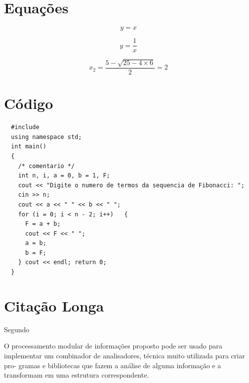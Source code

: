   \section{Equações}

  \begin{equation}
  y = x
  \end{equation}

  \begin{equation}
  y = \frac{1}{x}
  \end{equation}

  \begin{equation}
  x_2 = \frac{5 - \sqrt{25 - 4 \times 6}}{2} = 2
  \end{equation}

  \newpage
  \section{Código}

  \begin{lstlisting}
  #include 
  using namespace std;
  int main()
  {
    /* comentario */
    int n, i, a = 0, b = 1, F;
    cout << "Digite o numero de termos da sequencia de Fibonacci: ";
    cin >> n;
    cout << a << " " << b << " ";
    for (i = 0; i < n - 2; i++)   {
      F = a + b;
      cout << F << " ";
      a = b;
      b = F;
    } cout << endl; return 0;
  } \end{lstlisting}


  \section{Citação Longa}

Segundo \cite{cormen2009}

\begin{citacao}
O processamento modular de informações proposto pode ser usado
para implementar um combinador de analisadores, técnica muito utilizada para criar pro-
gramas e bibliotecas que fazem a análise de alguma informação e a transformam em uma
estrutura correspondente.
\end{citacao}
